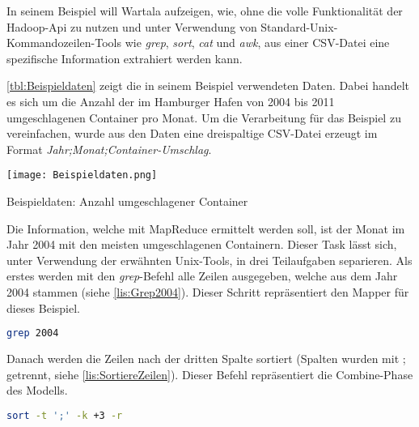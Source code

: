 In seinem Beispiel will Wartala aufzeigen, wie, ohne die volle Funktionalität der Hadoop-Api zu nutzen und unter Verwendung von Standard-Unix-Kommandozeilen-Tools wie \textit{grep}, \textit{sort}, \textit{cat} und \textit{awk}, aus einer CSV-Datei eine spezifische Information extrahiert werden kann.

\autoref{tbl:Beispieldaten} zeigt die in seinem Beispiel verwendeten Daten. Dabei handelt es sich um die Anzahl der im Hamburger Hafen von 2004 bis 2011 umgeschlagenen Container pro Monat. Um die Verarbeitung für das Beispiel zu vereinfachen, wurde aus den Daten eine dreispaltige CSV-Datei erzeugt im Format \textit{Jahr;Monat;Container-Umschlag}.

\begin{table}[h]
	\texttt{[image: Beispieldaten.png]}
	\caption{Beispieldaten: Anzahl umgeschlagener Container\footnotemark}
	\label{tbl:Beispieldaten}
\end{table}

Die Information, welche mit MapReduce ermittelt werden soll, ist der Monat im Jahr 2004 mit den meisten umgeschlagenen Containern. Dieser Task lässt sich, unter Verwendung der erwähnten Unix-Tools, in drei Teilaufgaben separieren. Als erstes werden mit den \textit{grep}-Befehl alle Zeilen ausgegeben, welche aus dem Jahr 2004 stammen (siehe \autoref{lis:Grep2004}). Dieser Schritt repräsentiert den Mapper für dieses Beispiel. \\

\begin{lstlisting}[language=bash, caption=Befehl zur Anzeige aller Zeilen mit Jahr 2004, title=\autoref*{lis:Grep2004}: Befehl zur Anzeige aller Zeilen mit Jahr 2004\protect\footnotemark, label=lis:Grep2004]
grep 2004
\end{lstlisting}

Danach werden die Zeilen nach der dritten Spalte sortiert (Spalten wurden mit ; getrennt, siehe \autoref{lis:SortiereZeilen}). Dieser Befehl repräsentiert die Combine-Phase des Modells. \\

\begin{lstlisting}[language=bash, caption=Befehl zur Sortierung der Zeilen nach der dritten Spalte, title=\autoref*{lis:SortiereZeilen}: Befehl zur Sortierung der Zeilen nach der dritten Spalte\protect\footnotemark, label=lis:SortiereZeilen]
sort -t ';' -k +3 -r
\end{lstlisting}

